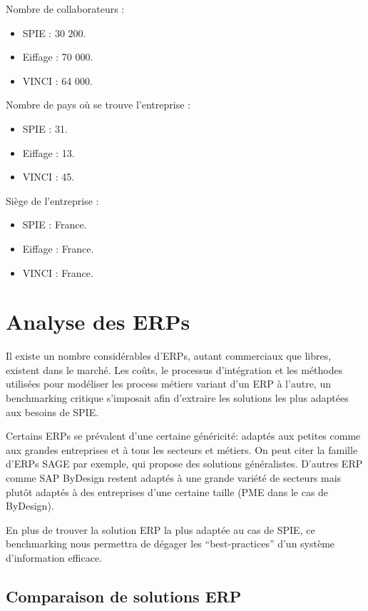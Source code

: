         Nombre de collaborateurs :
        \begin {itemize}
        	\item SPIE : 30 200.
        	\item Eiffage : 70 000.
        	\item VINCI : 64 000.
        \end{itemize}

        Nombre de pays où se trouve l'entreprise :
        \begin {itemize}
        	\item SPIE : 31.
        	\item Eiffage : 13.
        	\item VINCI : 45.
        \end{itemize}

        Siège de l'entreprise :
        \begin {itemize}
        	\item SPIE : France.
        	\item Eiffage : France.
        	\item VINCI : France.
        \end{itemize}


\section{Analyse des ERPs}

    Il existe un nombre considérables d'ERPs, autant commerciaux que libres, existent dans le marché. Les coûts, le processus d'intégration et les méthodes utilisées pour modéliser les process métiers variant d'un ERP à l'autre, un benchmarking critique s'imposait afin d'extraire les solutions les plus adaptées aux besoins de SPIE.

    Certains ERPs se prévalent d'une certaine généricité: adaptés aux petites comme aux grandes entreprises et à tous les secteurs et métiers. On peut citer la famille d'ERPs SAGE par exemple, qui propose des solutions généralistes. D'autres ERP comme SAP ByDesign restent adaptés à une grande variété de secteurs mais plutôt adaptés à des entreprises d'une certaine taille (PME dans le cas de ByDesign).

    En plus de trouver la solution ERP la plus adaptée au cas de SPIE, ce benchmarking nous permettra de dégager les ``best-practices'' d'un système d'information efficace.

    \subsection{Comparaison de solutions ERP}

